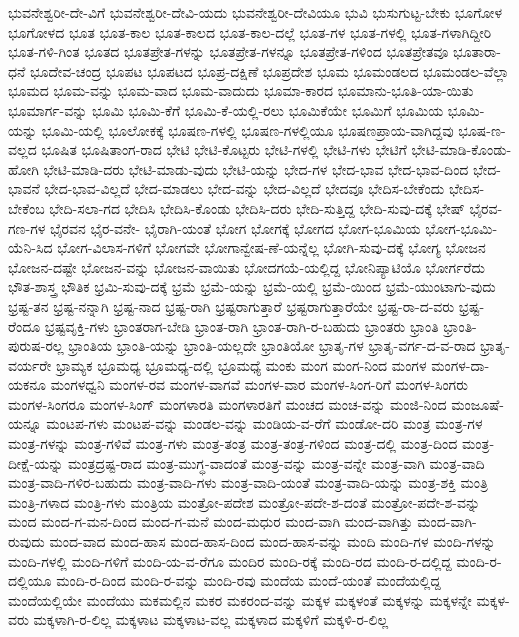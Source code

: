 {ಭುವನೇಶ್ವರೀ-ದೇ-ವಿಗೆ
ಭುವನೇಶ್ವರೀ-ದೇವಿ-ಯದು
ಭುವನೇಶ್ವರೀ-ದೇವಿಯೂ
ಭುವಿ
ಭುಸುಗುಟ್ಟ-ಬೇಕು
ಭೂಗೋಳ
ಭೂಗೋಳದ
ಭೂತ
ಭೂತ-ಕಾಲ
ಭೂತ-ಕಾಲದ
ಭೂತ-ಕಾಲ-ದಲ್ಲೆ
ಭೂತ-ಗಳ
ಭೂತ-ಗಳಲ್ಲಿ
ಭೂತ-ಗಳಾಗಿದ್ದೀರಿ
ಭೂತ-ಗಳಿ-ಗಿಂತ
ಭೂತದ
ಭೂತಪ್ರೇತ-ಗಳನ್ನು
ಭೂತಪ್ರೇತ-ಗಳನ್ನೂ
ಭೂತಪ್ರೇತ-ಗಳಿಂದ
ಭೂತಪ್ರೇತವೂ
ಭೂತಾರಾ-ಧನೆ
ಭೂದೇವ-ಚಂದ್ರ
ಭೂಪಟ
ಭೂಪಟದ
ಭೂಪ್ರ-ದಕ್ಷಿಣೆ
ಭೂಪ್ರದೇಶ
ಭೂಮ
ಭೂಮಂಡಲದ
ಭೂಮಂಡಲ-ವೆಲ್ಲಾ
ಭೂಮದ
ಭೂಮ-ವನ್ನು
ಭೂಮ-ವಾದ
ಭೂಮ-ವಾದುದು
ಭೂಮಾ-ಕಾರದ
ಭೂಮಾನು-ಭೂತಿ-ಯಾ-ಯಿತು
ಭೂಮಾರ್ಗ-ವನ್ನು
ಭೂಮಿ
ಭೂಮಿ-ಕೆಗೆ
ಭೂಮಿ-ಕೆ-ಯಲ್ಲಿ-ರಲು
ಭೂಮಿಕೆಯೇ
ಭೂಮಿಗೆ
ಭೂಮಿಯ
ಭೂಮಿ-ಯನ್ನು
ಭೂಮಿ-ಯಲ್ಲಿ
ಭೂಲೋಕಕ್ಕೆ
ಭೂಷಣ-ಗಳಲ್ಲಿ
ಭೂಷಣ-ಗಳಲ್ಲಿಯೂ
ಭೂಷಣಪ್ರಾಯ-ವಾಗಿದ್ದವು
ಭೂಷ-ಣ-ವಲ್ಲದ
ಭೂಷಿತ
ಭೂಷಿತಾಂಗ-ರಾದ
ಭೇಟಿ
ಭೇಟಿ-ಕೊಟ್ಟರು
ಭೇಟಿ-ಗಳಲ್ಲಿ
ಭೇಟಿ-ಗಳು
ಭೇಟಿಗೆ
ಭೇಟಿ-ಮಾಡಿ-ಕೊಂಡು-ಹೋಗಿ
ಭೇಟಿ-ಮಾಡಿ-ದರು
ಭೇಟಿ-ಮಾಡು-ವುದು
ಭೇಟಿ-ಯನ್ನು
ಭೇದ-ಗಳ
ಭೇದ-ಭಾವ
ಭೇದ-ಭಾವ-ದಿಂದ
ಭೇದ-ಭಾವನೆ
ಭೇದ-ಭಾವ-ವಿಲ್ಲದೆ
ಭೇದ-ಮಾಡಲು
ಭೇದ-ವನ್ನು
ಭೇದ-ವಿಲ್ಲದೆ
ಭೇದವೂ
ಭೇದಿಸ-ಬೇಕೆಂದು
ಭೇದಿಸ-ಬೇಕೆಂಬ
ಭೇದಿ-ಸಲಾ-ಗದ
ಭೇದಿಸಿ
ಭೇದಿಸಿ-ಕೊಂಡು
ಭೇದಿಸಿ-ದರು
ಭೇದಿ-ಸುತ್ತಿದ್ದ
ಭೇದಿ-ಸುವು-ದಕ್ಕೆ
ಭೇಷ್
ಭೈರವ-ಗಣ-ಗಳ
ಭೈರವನ
ಭೈರ-ವನೇ-
ಭೈರಾಗಿ-ಯಂತೆ
ಭೋಗ
ಭೋಗಕ್ಕೆ
ಭೋಗದ
ಭೋಗ-ಭೂಮಿಯ
ಭೋಗ-ಭೂಮಿ-ಯೆನಿ-ಸಿದ
ಭೋಗ-ವಿಲಾಸ-ಗಳಿಗೆ
ಭೋಗವೇ
ಭೋಗಾನ್ವೇಷ-ಣೆ-ಯನ್ನೆಲ್ಲ
ಭೋಗಿ-ಸುವು-ದಕ್ಕೆ
ಭೋಗ್ಯ
ಭೋಜನ
ಭೋಜನ-ದಷ್ಟೇ
ಭೋಜನ-ವನ್ನು
ಭೋಜನ-ವಾಯಿತು
ಭೋದಗಯೆ-ಯಲ್ಲಿದ್ದ
ಭೋನಿಪ್ಯಾಟಿಯೊ
ಭೋರ್ಗರೆದು
ಭೌತ-ಶಾಸ್ತ್ರ
ಭೌತಿಕ
ಭ್ರಮಿ-ಸುವು-ದಕ್ಕೆ
ಭ್ರಮೆ
ಭ್ರಮೆ-ಯನ್ನು
ಭ್ರಮೆ-ಯಲ್ಲಿ
ಭ್ರಮೆ-ಯಿಂದ
ಭ್ರಮೆ-ಯುಂಟಾಗು-ವುದು
ಭ್ರಷ್ಟ-ತನ
ಭ್ರಷ್ಟ-ನನ್ನಾಗಿ
ಭ್ರಷ್ಟ-ನಾದ
ಭ್ರಷ್ಟ-ರಾಗಿ
ಭ್ರಷ್ಟರಾಗುತ್ತಾರೆ
ಭ್ರಷ್ಟರಾಗುತ್ತಾರೆಯೇ
ಭ್ರಷ್ಟ-ರಾ-ದ-ವರು
ಭ್ರಷ್ಟ-ರೆಂದೂ
ಭ್ರಷ್ಟವೃಕ್ತಿ-ಗಳು
ಭ್ರಾಂತರಾಗ-ಬೇಡಿ
ಭ್ರಾಂತ-ರಾಗಿ
ಭ್ರಾಂತ-ರಾಗಿ-ರ-ಬಹುದು
ಭ್ರಾಂತರು
ಭ್ರಾಂತಿ
ಭ್ರಾಂತಿ-ಪುರುಷ-ರಲ್ಲ
ಭ್ರಾಂತಿಯ
ಭ್ರಾಂತಿ-ಯನ್ನು
ಭ್ರಾಂತಿ-ಯಲ್ಲದೇ
ಭ್ರಾಂತಿಯೋ
ಭ್ರಾತೃ-ಗಳ
ಭ್ರಾತೃ-ವರ್ಗ-ದ-ವ-ರಾದ
ಭ್ರಾತೃ-ವರ್ಯರೇ
ಭ್ರಾಮ್ಯಕ
ಭ್ರೂಮಧ್ಯ
ಭ್ರೂಮಧ್ಯ-ದಲ್ಲಿ
ಭ್ರೂಮಧ್ಯೆ
ಮಂಕು
ಮಂಗ
ಮಂಗ-ನಿಂದ
ಮಂಗಳ
ಮಂಗಳ-ದಾ-ಯಕನೂ
ಮಂಗಳಧ್ವನಿ
ಮಂಗಳ-ರವ
ಮಂಗಳ-ವಾಗವೆ
ಮಂಗಳ-ವಾರ
ಮಂಗಳ-ಸಿಂಗ-ರಿಗೆ
ಮಂಗಳ-ಸಿಂಗರು
ಮಂಗಳ-ಸಿಂಗರೂ
ಮಂಗಳ-ಸಿಂಗ್
ಮಂಗಳಾರತಿ
ಮಂಗಳಾರತಿಗೆ
ಮಂಚದ
ಮಂಚ-ವನ್ನು
ಮಂಜಿ-ನಿಂದ
ಮಂಜೂಷೆ-ಯನ್ನೂ
ಮಂಟಪ-ಗಳು
ಮಂಟಪ-ವನ್ನು
ಮಂಡಲ-ವನ್ನು
ಮಂಡಿಯ-ವ-ರೆಗೆ
ಮಂಡೋ-ದರಿ
ಮಂತ್ರ
ಮಂತ್ರ-ಗಳ
ಮಂತ್ರ-ಗಳನ್ನು
ಮಂತ್ರ-ಗಳಿವೆ
ಮಂತ್ರ-ಗಳು
ಮಂತ್ರ-ತಂತ್ರ
ಮಂತ್ರ-ತಂತ್ರ-ಗಳಿಂದ
ಮಂತ್ರ-ದಲ್ಲಿ
ಮಂತ್ರ-ದಿಂದ
ಮಂತ್ರ-ದೀಕ್ಷೆ-ಯನ್ನು
ಮಂತ್ರದ್ರಷ್ಟ-ರಾದ
ಮಂತ್ರ-ಮುಗ್ಧ-ವಾದಂತೆ
ಮಂತ್ರ-ವನ್ನು
ಮಂತ್ರ-ವನ್ನೇ
ಮಂತ್ರ-ವಾಗಿ
ಮಂತ್ರ-ವಾದಿ
ಮಂತ್ರ-ವಾದಿ-ಗಳಿರ-ಬಹುದು
ಮಂತ್ರ-ವಾದಿ-ಗಳು
ಮಂತ್ರ-ವಾದಿ-ಯಂತೆ
ಮಂತ್ರ-ವಾದಿ-ಯನ್ನು
ಮಂತ್ರ-ಶಕ್ತಿ
ಮಂತ್ರಿ
ಮಂತ್ರಿ-ಗಳಾದ
ಮಂತ್ರಿ-ಗಳು
ಮಂತ್ರಿಯ
ಮಂತ್ರೋ-ಪದೇಶ
ಮಂತ್ರೋ-ಪದೇ-ಶ-ದಂತೆ
ಮಂತ್ರೋ-ಪದೇ-ಶ-ವನ್ನು
ಮಂದ
ಮಂದ-ಗ-ಮನ-ದಿಂದ
ಮಂದ-ಗ-ಮನೆ
ಮಂದ-ಮಧುರ
ಮಂದ-ವಾಗಿ
ಮಂದ-ವಾಗಿತ್ತು
ಮಂದ-ವಾಗಿ-ರುವುದು
ಮಂದ-ವಾದ
ಮಂದ-ಹಾಸ
ಮಂದ-ಹಾಸ-ದಿಂದ
ಮಂದ-ಹಾಸ-ವನ್ನು
ಮಂದಿ
ಮಂದಿ-ಗಳ
ಮಂದಿ-ಗಳನ್ನು
ಮಂದಿ-ಗಳಲ್ಲಿ
ಮಂದಿ-ಗಳಿಗೆ
ಮಂದಿ-ಯ-ವ-ರೆಗೂ
ಮಂದಿರ
ಮಂದಿ-ರಕ್ಕೆ
ಮಂದಿ-ರದ
ಮಂದಿ-ರ-ದಲ್ಲಿದ್ದ
ಮಂದಿ-ರ-ದಲ್ಲಿಯೂ
ಮಂದಿ-ರ-ದಿಂದ
ಮಂದಿ-ರ-ವನ್ನು
ಮಂದಿ-ರವು
ಮಂದೆಯ
ಮಂದೆ-ಯಂತೆ
ಮಂದೆಯಲ್ಲಿದ್ದ
ಮಂದೆಯಲ್ಲಿಯೇ
ಮಂದೆಯು
ಮಕಮಲ್ಲಿನ
ಮಕರ
ಮಕರಂದ-ವನ್ನು
ಮಕ್ಕಳ
ಮಕ್ಕಳಂತೆ
ಮಕ್ಕಳನ್ನು
ಮಕ್ಕಳನ್ನೇ
ಮಕ್ಕಳ-ವರು
ಮಕ್ಕಳಾಗಿ-ರ-ಲಿಲ್ಲ
ಮಕ್ಕಳಾಟ
ಮಕ್ಕಳಾಟ-ವಲ್ಲ
ಮಕ್ಕಳಾದ
ಮಕ್ಕಳಿಗೆ
ಮಕ್ಕಳಿ-ರ-ಲಿಲ್ಲ
}
